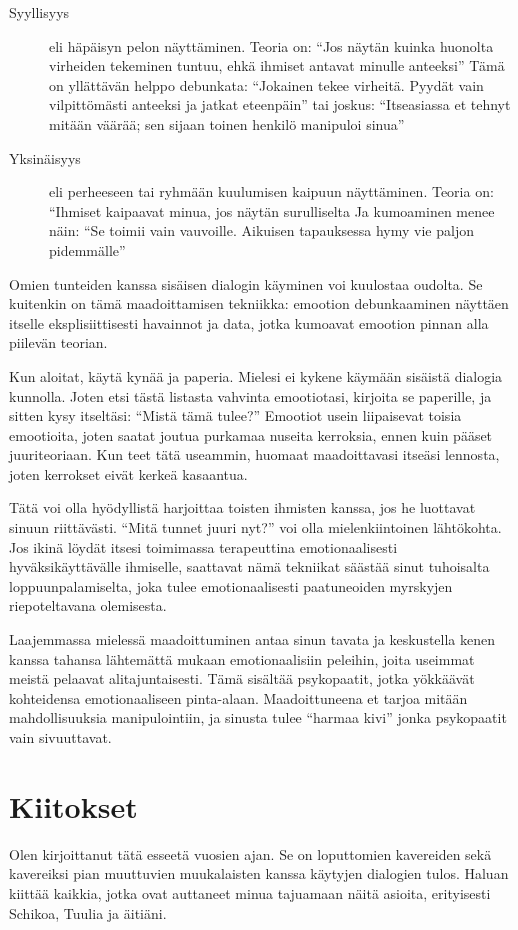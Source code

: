 \begin{description}
\item[Syyllisyys] eli häpäisyn pelon näyttäminen. Teoria on: ``Jos näytän kuinka huonolta virheiden tekeminen tuntuu, ehkä ihmiset antavat minulle anteeksi'' Tämä on yllättävän helppo debunkata: ``Jokainen tekee virheitä. Pyydät vain vilpittömästi anteeksi ja jatkat eteenpäin\vmq{,}'' tai joskus: ``Itseasiassa et tehnyt mitään väärää; sen sijaan toinen henkilö manipuloi sinua''
\item[Yksinäisyys] eli perheeseen tai ryhmään kuulumisen kaipuun näyttäminen. Teoria on: ``Ihmiset kaipaavat minua, jos näytän surulliselta Ja kumoaminen menee näin: ``Se toimii vain vauvoille. Aikuisen tapauksessa hymy vie paljon pidemmälle''
\end{description}
Omien tunteiden kanssa sisäisen dialogin käyminen voi kuulostaa oudolta. Se kuitenkin on tämä maadoittamisen tekniikka: emootion debunkaaminen näyttäen itselle eksplisiittisesti havainnot ja data, jotka kumoavat emootion pinnan alla piilevän teorian.

Kun aloitat, käytä kynää ja paperia. Mielesi ei kykene käymään sisäistä dialogia kunnolla. Joten etsi tästä listasta vahvinta emootiotasi, kirjoita se paperille, ja sitten kysy itseltäsi: ``Mistä tämä tulee?'' Emootiot usein liipaisevat toisia emootioita, joten saatat joutua purkamaa nuseita kerroksia, ennen kuin pääset juuriteoriaan. Kun teet tätä useammin, huomaat maadoittavasi itseäsi lennosta, joten kerrokset eivät kerkeä kasaantua.

Tätä voi olla hyödyllistä harjoittaa toisten ihmisten kanssa, jos he luottavat sinuun riittävästi. ``Mitä tunnet juuri nyt?'' voi olla mielenkiintoinen lähtökohta. Jos ikinä löydät itsesi toimimassa terapeuttina emotionaalisesti hyväksikäyttävälle ihmiselle, saattavat nämä tekniikat säästää sinut tuhoisalta loppuunpalamiselta, joka tulee emotionaalisesti paatuneoiden myrskyjen riepoteltavana olemisesta.

Laajemmassa mielessä maadoittuminen antaa sinun tavata ja keskustella kenen kanssa tahansa lähtemättä mukaan emotionaalisiin peleihin, joita useimmat meistä pelaavat alitajuntaisesti. Tämä sisältää psykopaatit, jotka yökkäävät kohteidensa emotionaaliseen pinta-alaan. Maadoittuneena et tarjoa mitään mahdollisuuksia manipulointiin, ja sinusta tulee ``harmaa kivi'' jonka psykopaatit vain sivuuttavat.

\section{Kiitokset}

Olen kirjoittanut tätä esseetä vuosien ajan. Se on loputtomien kavereiden sekä kavereiksi pian muuttuvien muukalaisten kanssa käytyjen dialogien tulos. Haluan kiittää kaikkia, jotka ovat auttaneet minua tajuamaan näitä asioita, erityisesti Schikoa, Tuulia ja äitiäni.

